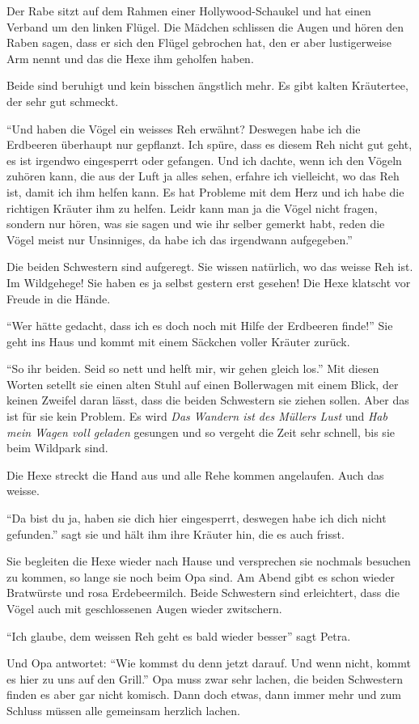 Der Rabe sitzt auf dem Rahmen einer Hollywood-Schaukel und hat einen Verband um den linken Flügel. Die Mädchen schlissen die Augen und hören den Raben sagen, dass er sich den Flügel gebrochen hat, den er aber lustigerweise Arm nennt und das die Hexe ihm geholfen haben.

Beide sind beruhigt und kein bisschen ängstlich mehr. Es gibt kalten Kräutertee, der sehr gut schmeckt. 

\enquote{Und haben die Vögel ein weisses Reh erwähnt? Deswegen habe ich die Erdbeeren überhaupt nur gepflanzt. Ich spüre, dass es diesem Reh nicht gut geht, es ist irgendwo eingesperrt oder gefangen. Und ich dachte, wenn ich den Vögeln zuhören kann, die aus der Luft ja alles sehen, erfahre ich vielleicht, wo das Reh ist, damit ich ihm helfen kann. Es hat Probleme mit dem Herz und ich habe die richtigen Kräuter ihm zu helfen. Leidr kann man ja die Vögel nicht fragen, sondern nur hören, was sie sagen und wie ihr selber gemerkt habt, reden die Vögel meist nur Unsinniges, da habe ich das irgendwann aufgegeben.}

Die beiden Schwestern sind aufgeregt. Sie wissen natürlich, wo das weisse Reh ist. Im Wildgehege! Sie haben es ja selbst gestern erst gesehen! Die Hexe klatscht vor Freude in die Hände. 

\enquote{Wer hätte gedacht, dass ich es doch noch mit Hilfe der Erdbeeren finde!} Sie geht ins Haus und kommt mit einem Säckchen voller Kräuter zurück. 

\enquote{So ihr beiden. Seid so nett und helft mir, wir gehen gleich los.} Mit diesen Worten setellt sie einen alten Stuhl auf einen Bollerwagen mit einem Blick, der keinen Zweifel daran lässt, dass die beiden Schwestern sie ziehen sollen. Aber das ist für sie kein Problem. Es wird \textit{Das Wandern ist des Müllers Lust} und \textit{Hab mein Wagen voll geladen} gesungen und so vergeht die Zeit sehr schnell, bis sie beim Wildpark sind.

Die Hexe streckt die Hand aus und alle Rehe kommen angelaufen. Auch das weisse.

\enquote{Da bist du ja, haben sie dich hier eingesperrt, deswegen habe ich dich nicht gefunden.} sagt sie und hält ihm ihre Kräuter hin, die es auch frisst.

Sie begleiten die Hexe wieder nach Hause und versprechen sie nochmals besuchen zu kommen, so lange sie noch beim Opa sind. Am Abend gibt es schon wieder Bratwürste und rosa Erdebeermilch. Beide Schwestern sind erleichtert, dass die Vögel auch mit geschlossenen Augen wieder zwitschern.

\enquote{Ich glaube, dem weissen Reh geht es bald wieder besser} sagt Petra.

Und Opa antwortet: \enquote{Wie kommst du denn jetzt darauf. Und wenn nicht, kommt es hier zu uns auf den Grill.} Opa muss zwar sehr lachen, die beiden Schwestern finden es aber gar nicht komisch. Dann doch etwas, dann immer mehr und zum Schluss müssen alle gemeinsam herzlich lachen.

 \hfill {\color{red}\decofourleft}

